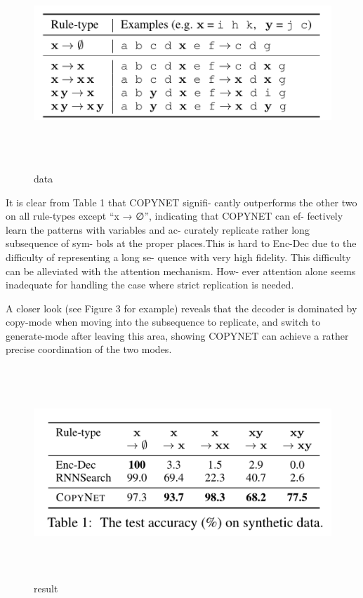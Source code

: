 \documentclass[UTF8]{ctexart}
\begin{document}
    \begin{figure}[htbp]
        \centering
        \vspace{-0.35cm} 
        \includegraphics[width=14cm,height=8cm]{pictures/zc.jpg}
        \caption{ data }
    \end{figure}

    It is clear from Table 1 that COPYNET signifi-
    cantly outperforms the other two on all rule-types
    except “x → ∅”, indicating that COPYNET can ef-
    fectively learn the patterns with variables and ac-
    curately replicate rather long subsequence of sym-
    bols at the proper places.This is hard to Enc-Dec
    due to the difficulty of representing a long se-
    quence with very high fidelity. This difficulty can
    be alleviated with the attention mechanism. How-
    ever attention alone seems inadequate for handling
    the case where strict replication is needed.

    A closer look (see Figure 3 for example) reveals that the decoder is dominated by copy-mode
    when moving into the subsequence to replicate,
    and switch to generate-mode after leaving this
    area, showing COPYNET can achieve a rather precise coordination of the two modes.
    

    \begin{figure}[htbp]
        \centering
        \vspace{-0.35cm} 
        \includegraphics[width=14cm,height=8cm]{pictures/jg.jpg}
        \caption{ result }
    \end{figure}
\end{document}

